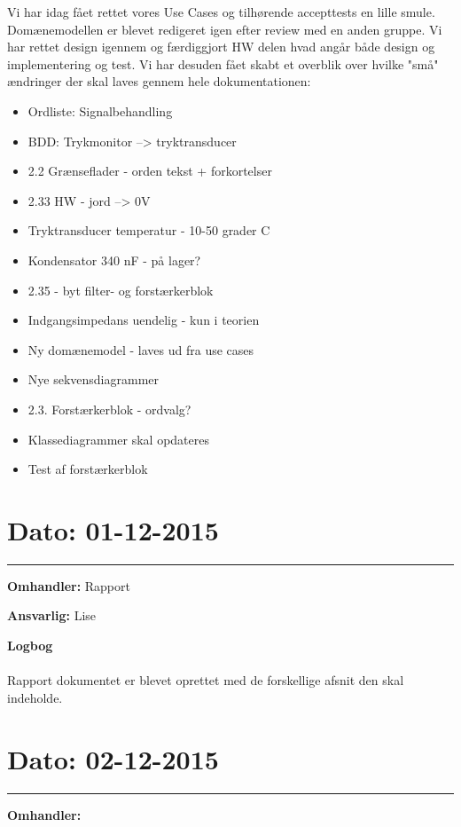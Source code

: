 Vi har idag fået rettet vores Use Cases og tilhørende accepttests en lille smule.
Domænemodellen er blevet redigeret igen efter review med en anden gruppe.
Vi har rettet design igennem og færdiggjort HW delen hvad angår både design og implementering og test.
Vi har desuden fået skabt et overblik over hvilke "små" ændringer der skal laves gennem hele dokumentationen:
\begin{itemize}
	\item Ordliste: Signalbehandling
	\item BDD: Trykmonitor --> tryktransducer
	\item 2.2 Grænseflader - orden tekst + forkortelser
	\item 2.33 HW - jord --> 0V
	\item Tryktransducer temperatur - 10-50 grader C
	\item Kondensator 340 nF - på lager? 
	\item 2.35 - byt filter- og forstærkerblok
	\item Indgangsimpedans uendelig - kun i teorien
	\item Ny domænemodel - laves ud fra use cases
	\item Nye sekvensdiagrammer
	\item 2.3. Forstærkerblok - ordvalg?
	\item Klassediagrammer skal opdateres
	\item Test af forstærkerblok
\end{itemize} 




\section{Dato: 01-12-2015 }
\hrule

\textbf{Omhandler:} Rapport

\textbf{Ansvarlig:} Lise

\textbf{Logbog}
\\
\\
Rapport dokumentet er blevet oprettet med de forskellige afsnit den skal indeholde. 




\section{Dato: 02-12-2015 }
\hrule

\textbf{Omhandler:} 

